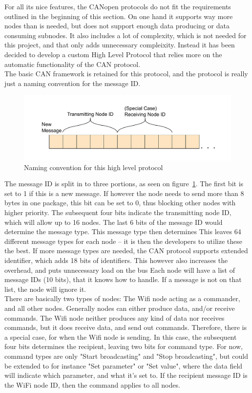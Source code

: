 For all its nice features, the CANopen protocols do not fit the requirements outlined in the beginning of this section. 
On one hand it supports way more nodes than is needed, but does not support enough data producing or data consuming subnodes.
It also includes a lot of complexity, which is not needed for this project, and that only adds unnecessary compleixity. 
Instead it has been decided to develop a custom High Level Protocol that relies more on the automatic functionality of the CAN protocol.\\

The basic CAN framework is retained for this protocol, and the protocol is really just a naming convention for the message ID. 

\begin{figure}[h!]
	\centering
	\includegraphics[width = 0.9\linewidth]{graphics/CAN_protocol_general_pdf}
	\caption{Naming convention for this high level protocol}
	\label{fig:CAN_protocol_general_pdf}
\end{figure}

The message ID is split in to three portions, as seen on figure~\ref{fig:CAN_protocol_general_pdf}.
The first bit is set to 1 if this is a new message.
If however the node needs to send more than 8 bytes in one package, this bit can be set to 0, thus blocking other nodes with higher priority.
The subsequent four bits indicate the transmitting node ID, which will allow up to 16 nodes. 
The last 6 bits of the message ID would determine the message type.
This message type then determines 
This leaves 64 different message types for each node -- it is then the developers to utilize these the best. 
If more message types are needed, the CAN protocol supports extended identifier, which adds 18 bits of identifiers.
This however also increases the overhead, and puts unnecessary load on the bus
Each node will have a list of message IDs (10 bits), that it knows how to handle.
If a message is not on that list, the node will ignore it.\\

There are basically two types of nodes: The Wifi node acting as a commander, and all other nodes.
Generally nodes can either produce data, and/or receive commands.
The Wifi node neither produces any kind of data nor receives commands, but it does receive data, and send out commands.
Therefore, there is a special case, for when the Wifi node is sending.
In this case, the subsequent four bits determines the recipient, leaving two bits for command type. 
For now, command types are only "Start broadcasting" and "Stop broadcasting", but could be extended to for instance "Set parameter" or "Set value", where the data field will indicate which parameter, and what it's set to.
If the recipient message ID is the WiFi node ID, then the command applies to all nodes.\\

